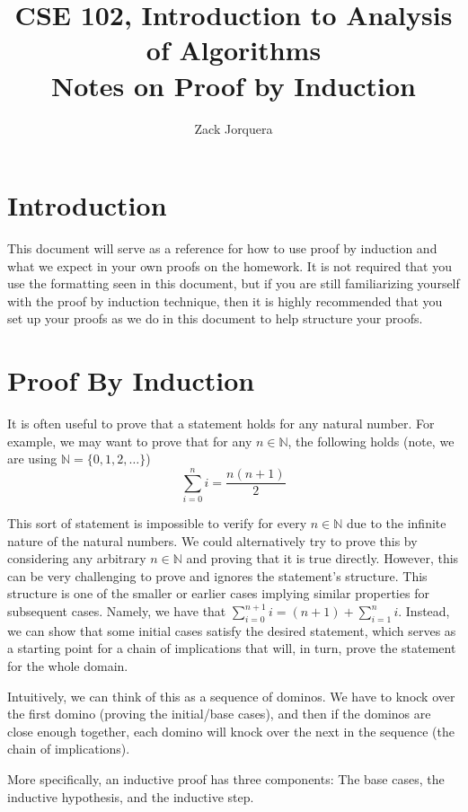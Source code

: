 \documentclass{article}
\title{CSE 102, Introduction to Analysis of Algorithms\\
Notes on Proof by Induction}
\author{Zack Jorquera}
\newcommand{\N}{\mathbb{N}}
\theoremstyle{plain}
\theoremstyle{definition}
\begin{document}
\maketitle

\section{Introduction}

This document will serve as a reference for how to use proof by induction and what we expect in your own proofs on the homework. It is not required that you use the formatting seen in this document, but if you are still familiarizing yourself with the proof by induction technique, then it is highly recommended that you set up your proofs as we do in this document to help structure your proofs.

\section{Proof By Induction}

It is often useful to prove that a statement holds for any natural number. For example, we may want to prove that for any \(n \in \N\), the following holds (note, we are using \(\N = \{0, 1, 2, \dotsc\}\))
\[\sum_{i=0}^n i = \frac{n(n+1)}{2}\]

This sort of statement is impossible to verify for every \(n \in \N\) due to the infinite nature of the natural numbers. We could alternatively try to prove this by considering any arbitrary \(n \in \N\) and proving that it is true directly. However, this can be very challenging to prove and ignores the statement's structure. This structure is one of the smaller or earlier cases implying similar properties for subsequent cases. Namely, we have that \(\sum_{i=0}^{n+1} i = (n+1) + \sum_{i=1}^n i\). Instead, we can show that some initial cases satisfy the desired statement, which serves as a starting point for a chain of implications that will, in turn, prove the statement for the whole domain.

Intuitively, we can think of this as a sequence of dominos. We have to knock over the first domino (proving the initial/base cases), and then if the dominos are close enough together, each domino will knock over the next in the sequence (the chain of implications).

More specifically, an inductive proof has three components: The base cases, the inductive hypothesis, and the inductive step.
\end{document}
